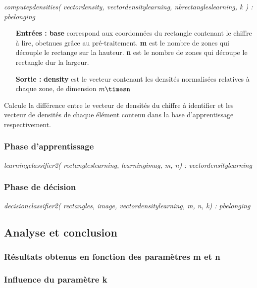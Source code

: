 \textit{computepdensities( vectordensity, vectordensitylearning, nbrectangleslearning, k ) : pbelonging}\\
\begin{itemize}
	\item[\textbf{Entrées :}] \textbf{base} correspond aux coordonnées du rectangle contenant le chiffre à lire, obetnues grâce au pré-traitement. \textbf{m} est le nombre de zones qui découple le rectange sur la hauteur. \textbf{n} est le nombre de zones qui découpe le rectangle dur la largeur.
	\item[\textbf{Sortie :}] \textbf{density} est le vecteur contenant les densités normalisées relatives à chaque zone, de dimension $m\timesn$
\end{itemize}
Calcule la différence entre le vecteur de densités du chiffre à identifier et les vecteur de densités de chaque élément contenu dans la base d'apprentissage respectivement.


\subsubsection{Phase d'apprentissage}

\textit{learningclassifier2( rectangleslearning, learningimag, m, n) : vectordensitylearning}


\subsubsection{Phase de décision}

\textit{decisionclassifier2( rectangles, image, vectordensitylearning, m, n, k) : pbelonging}


\subsection{Analyse et conclusion}

\subsubsection{Résultats obtenus en fonction des paramètres m et n}

\subsubsection{Influence du paramètre k}